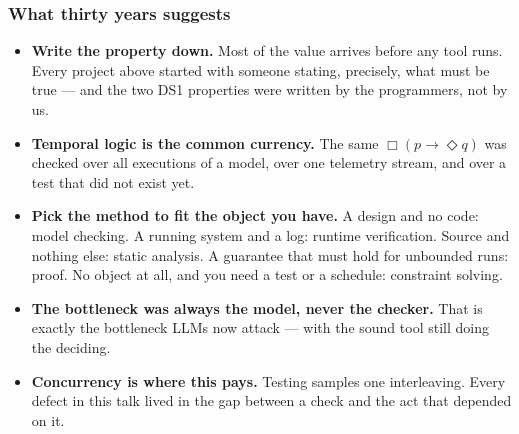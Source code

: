 \begin{frame}
  \frametitle{What thirty years suggests} \small

\begin{itemize}
\item {\bf Write the property down.} Most of the value arrives before any tool
      runs. Every project above started with someone stating, precisely, what must
      be true --- and the two DS1 properties were written by the programmers, not
      by us.

\pause
\item {\bf Temporal logic is the common currency.} The same $\Box(p \rightarrow
      \Diamond q)$ was checked over all executions of a model, over one telemetry
      stream, and over a test that did not exist yet.

\item {\bf Pick the method to fit the object you have.} A design and no code:
      model checking. A running system and a log: runtime verification. Source and
      nothing else: static analysis. A guarantee that must hold for unbounded runs:
      proof. No object at all, and you need a test or a schedule: constraint solving.

\pause
\item {\bf The bottleneck was always the model, never the checker.} That is
      exactly the bottleneck LLMs now attack --- with the sound tool still doing
      the deciding.

\pause
\item {\bf Concurrency is where this pays.} Testing samples one interleaving.
      Every defect in this talk lived in the gap between a check and the act that
      depended on it.
\end{itemize}

\end{frame}
